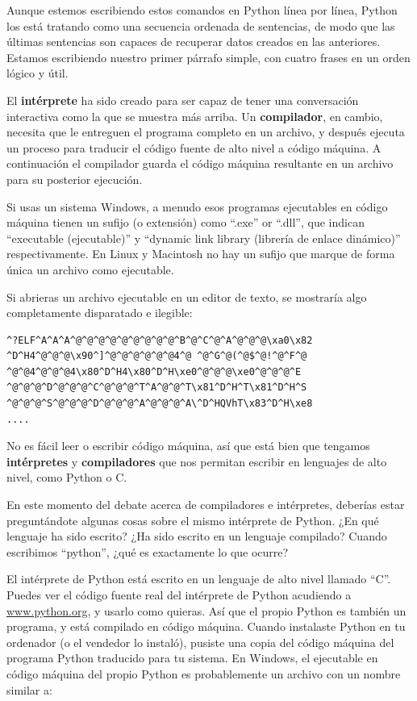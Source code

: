 Aunque estemos escribiendo estos comandos en Python línea por línea, Python
los está tratando como una secuencia ordenada de sentencias, de modo
que las últimas sentencias son capaces de recuperar datos creados en las
anteriores. Estamos escribiendo nuestro primer párrafo simple, con cuatro frases
en un orden lógico y útil.

El {\bf intérprete} ha sido creado para ser capaz de tener una conversación interactiva como la que se muestra más arriba.
Un {\bf compilador}, en cambio, necesita que le entreguen el programa
completo en un archivo, y después
ejecuta un proceso para traducir el código fuente de alto nivel a código máquina.
A continuación el compilador guarda el código máquina resultante en un archivo para su
posterior ejecución. 

Si usas un sistema Windows, a menudo esos programas ejecutables en código máquina
tienen un sufijo (o extensión) como ``.exe'' or ``.dll'', que indican ``executable (ejecutable)'' y ``dynamic
link library (librería de enlace dinámico)'' respectivamente. En Linux y Macintosh
no hay un sufijo que marque de forma única un archivo como ejecutable.

Si abrieras un archivo ejecutable en un editor de texto, se mostraría algo
completamente disparatado e ilegible:

\beforeverb
\begin{verbatim}
^?ELF^A^A^A^@^@^@^@^@^@^@^@^@^B^@^C^@^A^@^@^@\xa0\x82
^D^H4^@^@^@\x90^]^@^@^@^@^@^@4^@ ^@^G^@(^@$^@!^@^F^@
^@^@4^@^@^@4\x80^D^H4\x80^D^H\xe0^@^@^@\xe0^@^@^@^E
^@^@^@^D^@^@^@^C^@^@^@^T^A^@^@^T\x81^D^H^T\x81^D^H^S
^@^@^@^S^@^@^@^D^@^@^@^A^@^@^@^A\^D^HQVhT\x83^D^H\xe8
....
\end{verbatim}
\afterverb
%
No es fácil leer o escribir código máquina, así que está bien que tengamos
{\bf intérpretes} y {\bf compiladores} que nos permitan escribir en lenguajes
de alto nivel, como Python o C.

En este momento del debate acerca de compiladores e intérpretes, deberías
estar preguntándote algunas cosas sobre el mismo intérprete de Python. ¿En qué
lenguaje ha sido escrito? ¿Ha sido escrito en un lenguaje compilado? Cuando escribimos ``python'', ¿qué es exactamente lo que ocurre?

El intérprete de Python está escrito en un lenguaje de alto nivel llamado ``C''.
Puedes ver el código fuente real del intérprete de Python acudiendo a
\url{www.python.org}, y usarlo como quieras.
Así que el propio Python es también un programa, y está compilado en código máquina.
Cuando instalaste Python en tu ordenador (o el vendedor lo instaló),
pusiste una copia del código máquina del programa Python traducido para tu sistema.
En Windows, el ejecutable en código máquina del propio Python es probablemente
un archivo con un nombre similar a:

